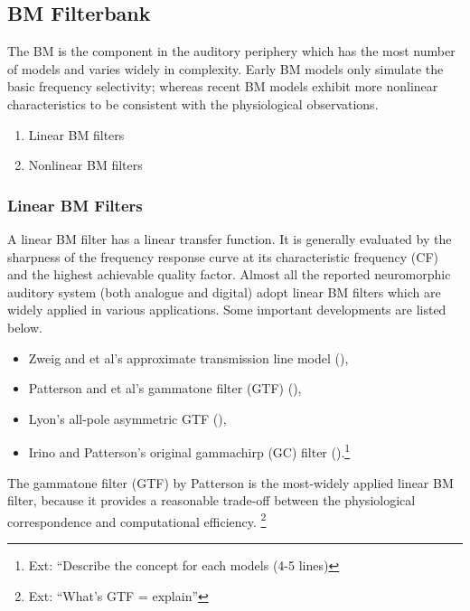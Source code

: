 \documentclass[11pt]{article}
\begin{document}
\subsection{BM Filterbank}
\label{sec-3-3}
\label{sec:ch2-bm-filterbank}

The BM is the component in the auditory periphery which has the most
number of models and varies widely in complexity. Early BM models only
simulate the basic frequency selectivity; whereas recent BM models
exhibit more nonlinear characteristics to be consistent with the
physiological observations.

\begin{enumerate}
\item Linear BM filters
\item Nonlinear BM filters
\end{enumerate}
\subsubsection{Linear BM Filters}
\label{sec-3-3-1}
\label{sec:ch2-linear-bm-filters}

A linear BM filter has a linear transfer function. It is
generally evaluated by the sharpness of the frequency response curve
at its characteristic frequency (CF) and the
highest achievable quality factor. Almost all the reported
neuromorphic auditory system (both analogue and digital) adopt linear
BM filters which are widely applied in various applications. Some
important developments are listed below.


\begin{itemize}
\item Zweig and et al's approximate transmission line model
  (\cite{Zweig1976}),
\item Patterson and et al's gammatone filter (GTF) (\cite{Patterson1992}),
\item Lyon's all-pole asymmetric GTF (\cite{Lyon1997}),
\item Irino and Patterson's original gammachirp (GC) filter
  (\cite{Irino1997}).\footnote{Ext: ``Describe the concept for each models (4-5 lines) }
\end{itemize}


The gammatone filter (GTF) by Patterson \cite{Patterson1992} is the
most-widely applied linear BM filter, because it provides a reasonable
trade-off between the physiological correspondence and computational
efficiency. \footnote{Ext: ``What's GTF = explain'' }
\end{document}
